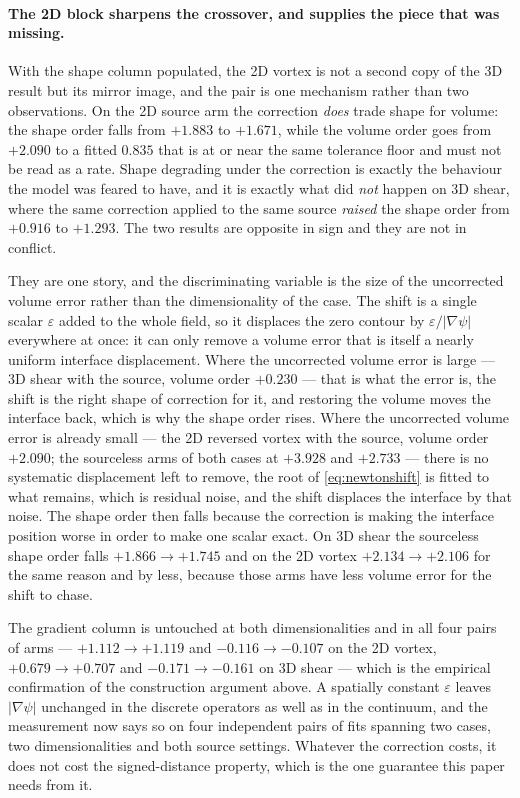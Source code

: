 \documentclass[preprint,3p,11pt]{elsarticle}
\newcommand{\psilev}{\psi}
\newcommand{\gradpsi}{\lvert\nabla\psilev\rvert}
\begin{document}
\paragraph{The 2D block sharpens the crossover, and supplies the piece that was
missing.} With the shape column populated, the 2D vortex is not a second copy of
the 3D result but its mirror image, and the pair is one mechanism rather than two
observations. On the 2D source arm the correction \emph{does} trade shape for
volume: the shape order falls from $+1.883$ to $+1.671$, while the volume order
goes from $+2.090$ to a fitted $0.835$ that is at or near the same tolerance floor
and must not be read as a rate. Shape degrading under the correction is exactly
the behaviour the model was feared to have, and it is exactly what did \emph{not}
happen on 3D shear, where the same correction applied to the same source
\emph{raised} the shape order from $+0.916$ to $+1.293$. The two results are
opposite in sign and they are not in conflict.

They are one story, and the discriminating variable is the size of the uncorrected
volume error rather than the dimensionality of the case. The shift is a single
scalar $\varepsilon$ added to the whole field, so it displaces the zero contour by
$\varepsilon/\gradpsi$ everywhere at once: it can only remove a volume error that
is itself a nearly uniform interface displacement. Where the uncorrected volume
error is large --- 3D shear with the source, volume order $+0.230$ --- that is
what the error is, the shift is the right shape of correction for it, and
restoring the volume moves the interface back, which is why the shape order rises.
Where the uncorrected volume error is already small --- the 2D reversed vortex
with the source, volume order $+2.090$; the sourceless arms of both cases at
$+3.928$ and $+2.733$ --- there is no systematic displacement left to remove, the
root of \eqref{eq:newtonshift} is fitted to what remains, which is residual noise,
and the shift displaces the interface by that noise. The shape order then falls
because the correction is making the interface position worse in order to make one
scalar exact. On 3D shear the sourceless shape order falls $+1.866 \to +1.745$ and
on the 2D vortex $+2.134 \to +2.106$ for the same reason and by less, because
those arms have less volume error for the shift to chase.

The gradient column is untouched at both dimensionalities and in all four pairs of
arms --- $+1.112 \to +1.119$ and $-0.116 \to -0.107$ on the 2D vortex,
$+0.679 \to +0.707$ and $-0.171 \to -0.161$ on 3D shear --- which is the empirical
confirmation of the construction argument above. A spatially constant
$\varepsilon$ leaves $\gradpsi$ unchanged in the discrete operators as well as in
the continuum, and the measurement now says so on four independent pairs of fits
spanning two cases, two dimensionalities and both source settings. Whatever the
correction costs, it does not cost the signed-distance property, which is the one
guarantee this paper needs from it.
\end{document}
